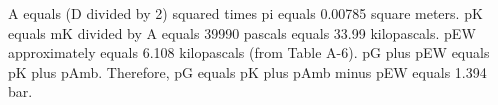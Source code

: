 A equals (D divided by 2) squared times pi equals 0.00785 square meters.  
pK equals mK divided by A equals 39990 pascals equals 33.99 kilopascals.  
pEW approximately equals 6.108 kilopascals (from Table A-6).  
pG plus pEW equals pK plus pAmb.  
Therefore, pG equals pK plus pAmb minus pEW equals 1.394 bar.